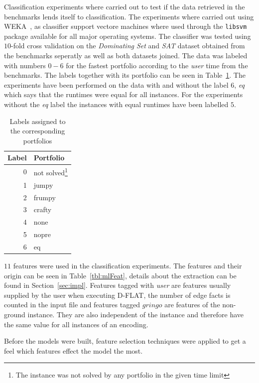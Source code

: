 Classification experiments where carried out to test if the data retrieved in the benchmarks lends itself to classification. The experiments where carried out using WEKA~\cite{WEKA}, as classifier support vectore machines where used through the \lstinline$libsvm$ package available for all major operating systems. The classifier was tested using $10$-fold cross validation on the \emph{Dominating Set} and \emph{SAT} dataset obtained from the benchmarks seperatly as well as both datasets joined. The data was labeled with numbers $0-6$ for the fastest portfolio according to the \emph{user} time from the benchmarks.
The labels together with its portfolio can be seen in Table~\ref{tbl:mlLabel}. The experiments have been performed on the data with and without the label $6$, \emph{eq} which says that the runtimes were equal for all instances. For the experiments without the \emph{eq} label the instances with equal runtimes have been labelled $5$.
\begin{table}[h]
	\center
	\begin{tabular}{|r|l|}
		\hline
		Label & Portfolio\\
		\hline
		0 & not solved\footnote{The instance was not solved by any portfolio in the given time limit} \\
		1 & jumpy\\
		2 & frumpy\\
		3 & crafty\\
		4 & none \\
		5 & nopre\\
		6 & eq\\
		\hline
	\end{tabular}
	\caption{Labels assigned to the corresponding portfolios}
	\label{tbl:mlLabel}
\end{table}


\par $11$ features were used in the classification experiments. The features and their origin can be seen in Table~\ref{tbl:mlFeat}, details about the extraction can be found in Section~\ref{sec:impl}. Features tagged with \emph{user} are features usually supplied by the user when executing D-FLAT, the number of edge facts is counted in the input file and features tagged $gringo$ are features of the non-ground instance. They are also independent of the instance and therefore have the same value for all instances of an encoding. 

Before the models were built, feature selection techniques were applied to get a feel which features effect the model the most.

